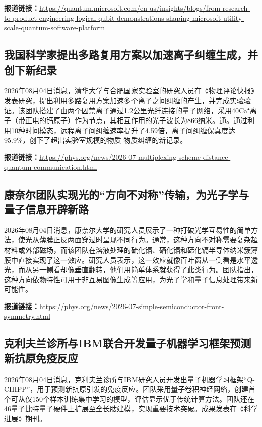 \documentclass[12pt,a4paper]{ctexart}
\begin{document}
\noindent\textbf{报道链接：}\url{https://quantum.microsoft.com/en-us/insights/blogs/from-research-to-product-engineering-logical-qubit-demonstrations-shaping-microsoft-utility-scale-quantum-software-platform}

\subsection{ 我国科学家提出多路复用方案以加速离子纠缠生成，并创下新纪录 }

2026年08月04日消息，清华大学与合肥国家实验室的研究人员在《物理评论快报》发表研究，提出利用多路复用方案加速多个离子之间纠缠的产生，并完成实验验证。该团队搭建了由两个囚禁离子通过1.2公里光纤连接的量子网络，采用40Ca⁺离子（带正电的钙原子）作为节点，其相互作用的光子波长为866纳米。通。通过利用10种时间模态，远程离子间纠缠速率提升了4.59倍，离子间纠缠保真度达95.9\%，创下了超出实验室规模的物质-物质纠缠的新记录。

\noindent\textbf{报道链接：}\url{https://phys.org/news/2026-07-multiplexing-scheme-distance-quantum-communication.html}

\subsection{ 康奈尔团队实现光的“方向不对称”传输，为光子学与量子信息开辟新路 }

2026年08月04日消息，康奈尔大学的研究人员展示了一种打破光学互易性的简单方法，使光从薄膜正反两面穿过时呈现不同行为。通常，这种方向不对称需要复杂超材料或外部磁场，而该团队在溶液处理的硫化镉、硒化镉和碲化镉半导体纳米簇薄膜中直接实现了这一效应。研究人员表示，这一效应就像百叶窗从一侧看是水平透光，而从另一侧看却像垂直翻转，他们用简单体系就获得了此类行为。团队指出，这种方向依赖特性可用于非互易图像生成等应用，为光子学和量子信息处理带来新可能性。

\noindent\textbf{报道链接：}\url{https://phys.org/news/2026-07-simple-semiconductor-front-symmetry.html}

\subsection{ 克利夫兰诊所与IBM联合开发量子机器学习框架预测新抗原免疫反应 }

2026年08月04日消息，克利夫兰诊所与IBM研究人员开发出量子机器学习框架“Q-CHIPP”，用于预测新抗原引发的免疫反应。团队采用量子卷积神经网络，创建首个可从仅150个样本训练集中学习的模型，评估显示优于传统计算方法。团队还在46量子比特量子硬件上扩展至全长肽建模，实现重要技术突破。成果发表在《科学进展》期刊。
\end{document}
